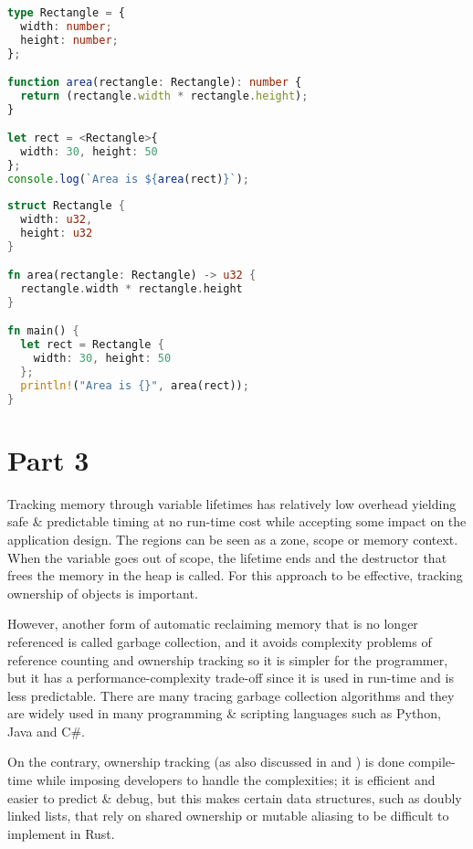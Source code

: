 \documentclass[10pt,a4paper,twocolumn]{article}
\begin{document}
\begin{lstlisting}[language=TypeScript,caption={Type system in TypeScript}]
type Rectangle = {
  width: number;
  height: number;
};

function area(rectangle: Rectangle): number {
  return (rectangle.width * rectangle.height);
}

let rect = <Rectangle>{
  width: 30, height: 50
};
console.log(`Area is ${area(rect)}`);
\end{lstlisting}

\newpage

\begin{lstlisting}[language=Rust,caption={Type system in Rust}]
struct Rectangle {
  width: u32,
  height: u32
}

fn area(rectangle: Rectangle) -> u32 {
  rectangle.width * rectangle.height
}

fn main() {
  let rect = Rectangle {
    width: 30, height: 50
  };
  println!("Area is {}", area(rect));
}
\end{lstlisting}

\section*{Part 3}\label{sec:part3}

Tracking memory through variable lifetimes has relatively low overhead yielding safe \& predictable timing at no run-time cost while accepting some impact on the application design. The regions can be seen as a zone, scope or memory context. When the variable goes out of scope, the lifetime ends and the destructor that frees the memory in the heap is called. For this approach to be effective, tracking ownership of objects is important.

However, another form of automatic reclaiming memory that is no longer referenced is called garbage collection, and it avoids complexity problems of reference counting and ownership tracking so it is simpler for the programmer, but it has a performance-complexity trade-off since it is used in run-time and is less predictable. There are many tracing garbage collection algorithms and they are widely used in many programming \& scripting languages such as Python, Java and C\#.

On the contrary, ownership tracking (as also discussed in  and ) is done compile-time while imposing developers to handle the complexities; it is efficient and easier to predict \& debug, but this makes certain data structures, such as doubly linked lists, that rely on shared ownership or mutable aliasing to be difficult to implement in Rust.
\end{document}
